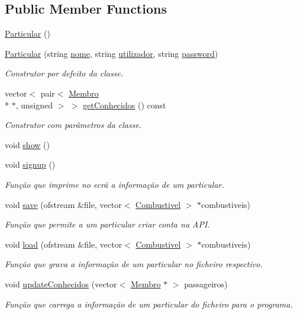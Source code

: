 \subsection*{Public Member Functions}
\begin{DoxyCompactItemize}
\item 
\hyperlink{class_particular_ac348d7cd078bbc184cf12f7ac8c7e589}{Particular} ()
\item 
\hyperlink{class_particular_a00248cda34d52ac67b531ca3f71d557d}{Particular} (string \hyperlink{class_membro_a2598bbe34ae32a98f41468b2202a9555}{nome}, string \hyperlink{class_membro_a42cc733ff94ec8d1bbfdacc62dfbb0e7}{utilizador}, string \hyperlink{class_membro_ae2b12fc3e91efc674c07e735edf4ac21}{password})
\begin{DoxyCompactList}\small\item\em Construtor por defeito da classe. \end{DoxyCompactList}\item 
vector$<$ pair$<$ \hyperlink{class_membro}{Membro} \\*
$\ast$, unsigned $>$ $>$ \hyperlink{class_particular_a4449ee915348f09a2c5b96f3f8106a55}{get\+Conhecidos} () const 
\begin{DoxyCompactList}\small\item\em Construtor com parâmetros da classe. \end{DoxyCompactList}\item 
void \hyperlink{class_particular_a01235e9f582726e6068b176cd4b8795b}{show} ()
\item 
void \hyperlink{class_particular_aa8459c54108da82bb5ae21f2779c53da}{signup} ()
\begin{DoxyCompactList}\small\item\em Função que imprime no ecrã a informação de um particular. \end{DoxyCompactList}\item 
void \hyperlink{class_particular_a3925d68794b2e91a9c46346e5110b013}{save} (ofstream \&file, vector$<$ \hyperlink{class_combustivel}{Combustivel} $>$ $\ast$combustiveis)
\begin{DoxyCompactList}\small\item\em Função que permite a um particular criar conta na A\+P\+I. \end{DoxyCompactList}\item 
void \hyperlink{class_particular_a1da22ddfc6b6fc1c562cf4dcdc649e2a}{load} (ofstream \&file, vector$<$ \hyperlink{class_combustivel}{Combustivel} $>$ $\ast$combustiveis)
\begin{DoxyCompactList}\small\item\em Função que grava a informação de um particular no ficheiro respectivo. \end{DoxyCompactList}\item 
void \hyperlink{class_particular_a544f2ee62236cd4734aa6a7e9848fbae}{update\+Conhecidos} (vector$<$ \hyperlink{class_membro}{Membro} $\ast$ $>$ passageiros)
\begin{DoxyCompactList}\small\item\em Função que carrega a informação de um particular do ficheiro para o programa. \end{DoxyCompactList}\end{DoxyCompactItemize}
